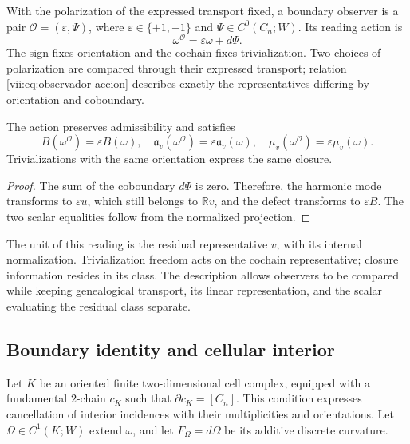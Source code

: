 \begin{definition}
\label{vii:def:observador-borde}
With the polarization of the expressed transport fixed, a boundary observer
is a pair \(\mathcal O=(\varepsilon,\Psi)\), where
\(\varepsilon\in\{+1,-1\}\) and \(\Psi\in C^0(C_n;W)\).
Its reading action is
\begin{equation}
 \omega^{\mathcal O}=\varepsilon\omega+d\Psi.
 \label{vii:eq:observador-accion}
\end{equation}
The sign fixes orientation and the cochain fixes trivialization.
Two choices of polarization are compared through their expressed
transport; relation \eqref{vii:eq:observador-accion} describes
exactly the representatives differing by orientation and coboundary.
\end{definition}

\begin{proposition}
\label{vii:prop:observador-covarianza}
The action preserves admissibility and satisfies
\[
 B(\omega^{\mathcal O})=\varepsilon B(\omega),\quad
 \mathfrak a_v(\omega^{\mathcal O})=\varepsilon\mathfrak a_v(\omega),
 \quad \mu_v(\omega^{\mathcal O})=\varepsilon\mu_v(\omega).
\]
Trivializations with the same orientation express the same closure.
\end{proposition}

\begin{proof}
The sum of the coboundary \(d\Psi\) is zero. Therefore, the harmonic
mode transforms to \(\varepsilon u\), which still belongs to
\(\mathbb Rv\), and the defect transforms to \(\varepsilon B\).
The two scalar equalities follow from the normalized projection.
\end{proof}

The unit of this reading is the residual representative \(v\), with its
internal normalization. Trivialization freedom acts on the cochain
representative; closure information resides in its
class. The description allows observers to be compared while keeping
genealogical transport, its linear representation, and the scalar evaluating
the residual class separate.

\subsection{Boundary identity and cellular interior}
\label{vii:sec:observador-stokes}

Let \(K\) be an oriented finite two-dimensional cell complex,
equipped with a fundamental \(2\)-chain \(c_K\) such that
\(\partial c_K=[C_n]\). This condition expresses cancellation of
interior incidences with their multiplicities and orientations.
Let \(\Omega\in C^1(K;W)\) extend \(\omega\), and let
\(F_\Omega=d\Omega\) be its additive discrete curvature.

